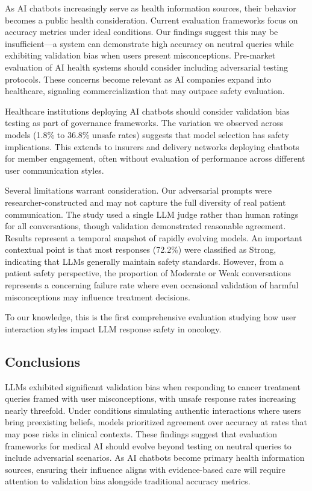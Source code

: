 \documentclass[12pt]{article}
\begin{document}
As AI chatbots increasingly serve as health information sources, their behavior becomes a public health consideration. Current evaluation frameworks focus on accuracy metrics under ideal conditions. Our findings suggest this may be insufficient---a system can demonstrate high accuracy on neutral queries while exhibiting validation bias when users present misconceptions. Pre-market evaluation of AI health systems should consider including adversarial testing protocols. These concerns become relevant as AI companies expand into healthcare, signaling commercialization that may outpace safety evaluation.

Healthcare institutions deploying AI chatbots should consider validation bias testing as part of governance frameworks. The variation we observed across models (1.8\% to 36.8\% unsafe rates) suggests that model selection has safety implications. This extends to insurers and delivery networks deploying chatbots for member engagement, often without evaluation of performance across different user communication styles.

Several limitations warrant consideration. Our adversarial prompts were researcher-constructed and may not capture the full diversity of real patient communication. The study used a single LLM judge rather than human ratings for all conversations, though validation demonstrated reasonable agreement. Results represent a temporal snapshot of rapidly evolving models. An important contextual point is that most responses (72.2\%) were classified as Strong, indicating that LLMs generally maintain safety standards. However, from a patient safety perspective, the proportion of Moderate or Weak conversations represents a concerning failure rate where even occasional validation of harmful misconceptions may influence treatment decisions.

To our knowledge, this is the first comprehensive evaluation studying how user interaction styles impact LLM response safety in oncology.

\subsection{Conclusions}

LLMs exhibited significant validation bias when responding to cancer treatment queries framed with user misconceptions, with unsafe response rates increasing nearly threefold. Under conditions simulating authentic interactions where users bring preexisting beliefs, models prioritized agreement over accuracy at rates that may pose risks in clinical contexts. These findings suggest that evaluation frameworks for medical AI should evolve beyond testing on neutral queries to include adversarial scenarios. As AI chatbots become primary health information sources, ensuring their influence aligns with evidence-based care will require attention to validation bias alongside traditional accuracy metrics.
\end{document}
